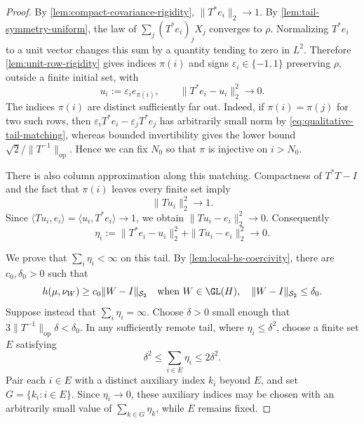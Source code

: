 \begin{proof}
By \cref{lem:compact-covariance-rigidity}, $\|T^*e_i\|_2\to1$.
By \cref{lem:tail-symmetry-uniform}, the law of
$\sum_j(T^*e_i)_jX_j$ converges to $\rho$.
Normalizing $T^*e_i$ to a unit vector changes this sum by a quantity tending to
zero in $L^2$.
Therefore \cref{lem:unit-row-rigidity} gives indices $\pi(i)$ and signs
$\varepsilon_i\in\{-1,1\}$ preserving $\rho$, outside a finite initial set, with
\begin{equation}
 u_i:=\varepsilon_i e_{\pi(i)},\qquad
 \|T^*e_i-u_i\|_2^2\longrightarrow0.
 \label{eq:qualitative-tail-matching}
 \end{equation}
The indices $\pi(i)$ are distinct sufficiently far out.
Indeed, if
$\pi(i)=\pi(j)$ for two such rows, then
$\varepsilon_iT^*e_i-\varepsilon_jT^*e_j$ has arbitrarily small norm
by \eqref{eq:qualitative-tail-matching}, whereas bounded
invertibility gives the lower bound $\sqrt2/\|T^{-1}\|_{\mathrm{op}}$.
Hence we can fix $N_0$ so that $\pi$ is injective on $i>N_0$.

There is also column approximation along this matching.
Compactness
of $T^*T-I$ and the fact that $\pi(i)$ leaves every finite set imply
\[
 \|Tu_i\|_2^2\longrightarrow1.
\]
Since $\langle Tu_i,e_i\rangle=\langle u_i,T^*e_i\rangle\to1$,
we obtain $\|Tu_i-e_i\|_2^2\to0$.  Consequently
\begin{equation}
 \eta_i:=\|T^*e_i-u_i\|_2^2+\|Tu_i-e_i\|_2^2\longrightarrow0.
 \label{eq:row-column-tail-errors}
\end{equation}

We prove that $\sum_i\eta_i<\infty$ on this tail.
By
\cref{lem:local-hs-coercivity}, there are $c_0,\delta_0>0$ such
that
\begin{equation}
 h(\mu,\nu_W)\geq c_0\|W-I\|_{\mathcal S_2}
 \quad\text{when }W\in\GL(H),\quad
 \|W-I\|_{\mathcal S_2}\leq\delta_0.
 \label{eq:local-lower-used}
\end{equation}
Suppose instead that $\sum_i\eta_i=\infty$.
Choose $\delta>0$ small enough that
$3\|T^{-1}\|_{\mathrm{op}}\delta<\delta_0$.  In any sufficiently remote tail,
where $\eta_i\leq\delta^2$, choose a finite set $E$ satisfying
\begin{equation}
 \delta^2\leq\sum_{i\in E}\eta_i\leq2\delta^2.
 \label{eq:active-tail-error}
\end{equation}
Pair each $i\in E$ with a distinct auxiliary index
$k_i$ beyond $E$, and set $G=\{k_i:i\in E\}$.
Since $\eta_i\to0$, these auxiliary indices may be chosen with
an arbitrarily small value of $\sum_{k\in G}\eta_k$, while $E$ remains fixed.


\end{proof}
